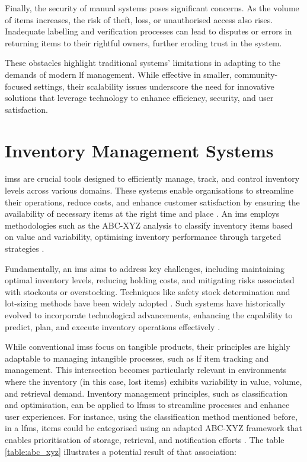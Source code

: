 Finally, the security of manual systems poses significant concerns. As the volume of items increases, the risk of theft, loss, or unauthorised access also rises. Inadequate labelling and verification processes can lead to disputes or errors in returning items to their rightful owners, further eroding trust in the system.

These obstacles highlight traditional systems' limitations in adapting to the demands of modern \ac{lf} management. While effective in smaller, community-focused settings, their scalability issues underscore the need for innovative solutions that leverage technology to enhance efficiency, security, and user satisfaction.


\section{Inventory Management Systems} \label{sec:ims}

\acp{ims} are crucial tools designed to efficiently manage, track, and control inventory levels across various domains. These systems enable organisations to streamline their operations, reduce costs, and enhance customer satisfaction by ensuring the availability of necessary items at the right time and place \cite{Pauliina2024}. An \ac{ims} employs methodologies such as the ABC-XYZ analysis to classify inventory items based on value and variability, optimising inventory performance through targeted strategies \cite{Pauliina2024}.

Fundamentally, an \ac{ims} aims to address key challenges, including maintaining optimal inventory levels, reducing holding costs, and mitigating risks associated with stockouts or overstocking. Techniques like safety stock determination and lot-sizing methods have been widely adopted \cite{Prabakaran2023}. Such systems have historically evolved to incorporate technological advancements, enhancing the capability to predict, plan, and execute inventory operations effectively \cite{Chebet2019}.

While conventional \acp{ims} focus on tangible products, their principles are highly adaptable to managing intangible processes, such as \ac{lf} item tracking and management. This intersection becomes particularly relevant in environments where the inventory (in this case, lost items) exhibits variability in value, volume, and retrieval demand. Inventory management principles, such as classification and optimisation, can be applied to \acp{lfms} to streamline processes and enhance user experiences. For instance, using the classification method mentioned before, in a \ac{lfms}, items could be categorised using an adapted ABC-XYZ framework that enables prioritisation of storage, retrieval, and notification efforts \cite{Khobragade2018}. The table \ref{table:abc_xyz} illustrates a potential result of that association:

